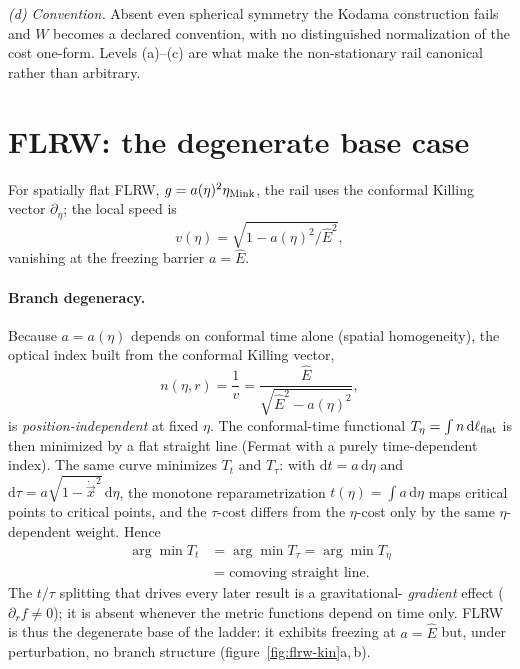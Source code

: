\documentclass[12pt]{iopart}
\newcommand{\Ehat}{\hat E}
\newcommand{\dd}{\mathrm{d}}
\begin{document}
\emph{(d) Convention.} Absent even spherical symmetry the Kodama construction
fails and $W$ becomes a declared convention, with no distinguished normalization
of the cost one-form. Levels (a)--(c) are what make the non-stationary rail
canonical rather than arbitrary.


\section{FLRW: the degenerate base case}
\label{sec:flrw}
For spatially flat FLRW, $g=a(\eta)^2\eta_{\rm Mink}$, the rail uses the
conformal Killing vector $\partial_\eta$; the local speed is
\begin{equation}
    v(\eta)=\sqrt{1-a(\eta)^2/\Ehat^{2}},
    \label{eq:flrwspeed}
\end{equation}
vanishing at the freezing barrier $a=\Ehat$.
\paragraph{Branch degeneracy.} Because $a=a(\eta)$ depends on conformal time
alone (spatial homogeneity), the optical index built from the conformal Killing
vector,
\begin{equation}
    n(\eta,r)=\frac1v=\frac{\Ehat}{\sqrt{\Ehat^2-a(\eta)^2}},
    \label{eq:flrwindex}
\end{equation}
is \emph{position-independent} at fixed $\eta$. The conformal-time functional
$T_\eta=\int n\,\dd\ell_{\rm flat}$ is then minimized by a flat straight line
(Fermat with a purely time-dependent index). The same curve minimizes $T_t$ and
$T_\tau$: with $\dd t=a\,\dd\eta$ and $\dd\tau=a\sqrt{1-\dot{\vec x}^2}\,\dd\eta$,
the monotone reparametrization $t(\eta)=\int a\,\dd\eta$ maps critical points to
critical points, and the $\tau$-cost differs from the $\eta$-cost only by the
same $\eta$-dependent weight. Hence
\begin{equation}
\begin{split}
    \arg\min T_t&=\arg\min T_\tau=\arg\min T_\eta\\
    &=\text{comoving straight line}.
\end{split}
    \label{eq:flrwdegen}
\end{equation}
The $t/\tau$ splitting that drives every later result is a gravitational-%
\emph{gradient} effect ($\partial_r f\neq0$); it is absent whenever the metric
functions depend on time only. FLRW is thus the degenerate base of the ladder:
it exhibits freezing at $a=\Ehat$ but, under perturbation, no branch structure
(figure~\ref{fig:flrw-kin}a,\,b).
\end{document}
